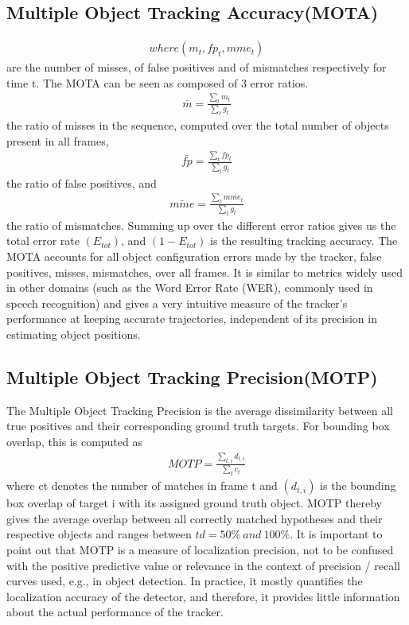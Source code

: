     \subsection{Multiple Object Tracking Accuracy(MOTA)}
        \begin{align}
            [MOTA = 1 - \frac{\sum_{t} (m_t + fp_t + mme_t)}{\sum_{t} g_t}] where (m_t, fp_t, mme_t)
        \end{align} 
        are  the number of misses, of false positives and of mismatches respectively for time t. The MOTA can be seen as composed of 3 error ratios.
        \begin{align}
            \bar{m} = \frac{\sum_{t} m_t}{\sum_{t} g_t}
        \end{align}
        the ratio of misses in the sequence, computed over the total number of objects present in all frames,
        \begin{align}
            \bar{fp} = \frac{\sum_{t} fp_t}{\sum_{t} g_t}
        \end{align}
        the ratio of false positives, and
        \begin{align}
            \bar{mme} = \frac{\sum_{t} mme_t}{\sum_{t} g_t}
        \end{align}
        the ratio of mismatches. Summing up over the different error ratios gives us the total error rate $(E_{tot})$, and $(1 - E_{tot})$ is the resulting tracking accuracy. The MOTA accounts for all object configuration errors made by the tracker, false positives, misses, mismatches, over all frames. It is similar to metrics widely used in other domains (such as the Word Error Rate (WER), 
        commonly used in speech recognition) and gives a very intuitive measure of the tracker’s performance at keeping accurate trajectories, independent of its precision in estimating object positions.
    \subsection{Multiple Object Tracking Precision(MOTP)}
        The Multiple Object Tracking Precision is the average dissimilarity between all true positives and their corresponding ground truth targets. For bounding box overlap, this is computed as
        \begin{align}
            MOTP = \frac{\sum_{t, i} d_{t, i}}{\sum_{t} c_t}
        \end{align}
        where ct denotes the number of matches in frame t and $(d_{t, i})$ is the bounding box overlap of target i with its assigned ground truth object. MOTP thereby gives the average overlap between all correctly matched hypotheses and their respective objects and ranges between \( td = 50\% \: and \: 100\% \). It is important to point out that MOTP is a measure of localization precision, 
        not to be confused with the positive predictive value or relevance in the context of precision / recall curves used, e.g., in object detection. In practice, it mostly quantifies the localization accuracy of the detector, and therefore, it provides little information about the actual performance of the tracker.
